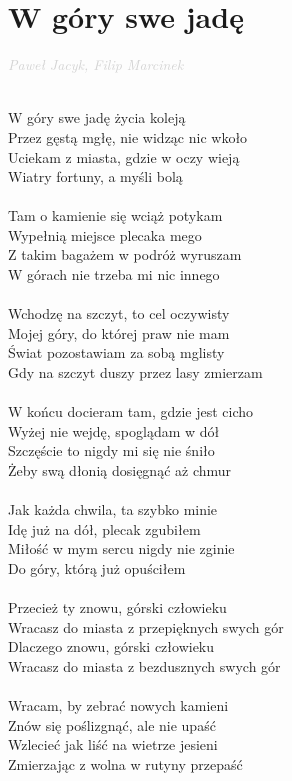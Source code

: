 \documentclass[a5paper, 10pt]{book}
\begin{document}
\section{W góry swe jadę}\textcolor{lightgray}{\textit{Paweł Jacyk, Filip Marcinek}}\\~\\
\begin{minipage}[t]{0.6\textwidth}
  W góry swe jadę życia koleją\\
  Przez gęstą mgłę, nie widząc nic wkoło\\
  Uciekam z miasta, gdzie w oczy wieją\\
  Wiatry fortuny, a myśli bolą\\
  \\
  Tam o kamienie się wciąż potykam\\
  Wypełnią miejsce plecaka mego\\
  Z takim bagażem w podróż wyruszam\\
  W górach nie trzeba mi nic innego\\
  \\
  Wchodzę na szczyt, to cel oczywisty\\
  Mojej góry, do której praw nie mam\\
  Świat pozostawiam za sobą mglisty\\
  Gdy na szczyt duszy przez lasy zmierzam\\
  \\
  W końcu docieram tam, gdzie jest cicho\\
  Wyżej nie wejdę, spoglądam w dół\\
  Szczęście to nigdy mi się nie śniło\\
  Żeby swą dłonią dosięgnąć aż chmur\\
  \\
  Jak każda chwila, ta szybko minie\\
  Idę już na dół, plecak zgubiłem\\
  Miłość w mym sercu nigdy nie zginie\\
  Do góry, którą już opuściłem\\
  \\
  \hspace*{4mm}Przecież ty znowu, górski człowieku\\
  \hspace*{4mm}Wracasz do miasta z przepięknych swych gór\\
  \hspace*{4mm}Dlaczego znowu, górski człowieku\\
  \hspace*{4mm}Wracasz do miasta z bezdusznych swych gór\\
  \\
  Wracam, by zebrać nowych kamieni\\
  Znów się poślizgnąć, ale nie upaść\\
  Wzlecieć jak liść na wietrze jesieni\\
  Zmierzając z wolna w rutyny przepaść\\

\end{minipage}
\end{document}
